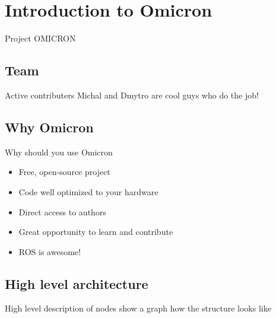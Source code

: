 \documentclass{beamer}
\begin{document}
\section{Introduction to Omicron}
\begin{frame}
\begin{center}
\Huge Project OMICRON
\end{center}
\end{frame}

\subsection{Team}
\begin{frame}{Active contributers}
Michal and Dmytro are cool guys who do the job!
\end{frame}

\subsection{Why Omicron}
\begin{frame}{Why should you use Omicron}
\begin{itemize}
\item Free, open-source project
\item Code well optimized to your hardware
\item Direct access to authors
\item Great opportunity to learn and contribute
\item ROS is awesome!
\end{itemize}

\end{frame}

\subsection{High level architecture}
\begin{frame}{High level description of nodes}
show a graph how the structure looks like
\end{frame}
\end{document}
